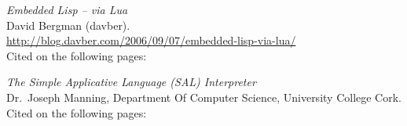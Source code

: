 \begin{thebibliography}{9}
  \emph{Embedded Lisp -- via Lua} \\
  David Bergman (davber). \\
  \url{http://blog.davber.com/2006/09/07/embedded-lisp-via-lua/} \\
  Cited on the following pages: 
  
  \emph{The Simple Applicative Language (SAL) Interpreter} \\
  Dr.\ Joseph Manning,
  Department Of Computer Science,
  University College Cork. \\
  Cited on the following pages: 

\end{thebibliography}
